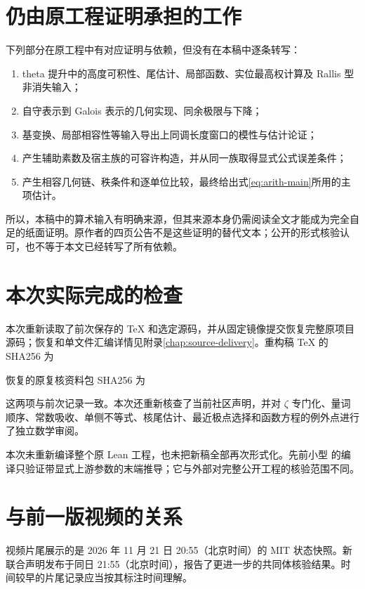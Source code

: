 \documentclass[UTF8,fontset=fandol,a4paper,openany,oneside]{ctexbook}
\theoremstyle{definition}
\theoremstyle{remark}
\begin{document}
\section{仍由原工程证明承担的工作}
下列部分在原工程中有对应证明与依赖，但没有在本稿中逐条转写：
\begin{enumerate}
\item theta 提升中的高度可积性、尾估计、局部函数、实位最高权计算及 Rallis 型非消失输入；
\item 自守表示到 Galois 表示的几何实现、同余极限与下降；
\item 基变换、局部相容性等输入导出上同调长度窗口的模性与估计论证；
\item 产生辅助素数及宿主族的可容许构造，并从同一族取得显式公式误差条件；
\item 产生相容几何链、秩条件和逐单位比较，最终给出式\eqref{eq:arith-main}所用的主项估计。
\end{enumerate}

所以，本稿中的算术输入有明确来源，但其来源本身仍需阅读全文才能成为完全自足的纸面证明。原作者的四页公告不是这些证明的替代文本；公开的形式核验认可，也不等于本文已经转写了所有依赖。

\section{本次实际完成的检查}
本次重新读取了前次保存的 TeX 和选定源码，并从固定镜像提交恢复完整原项目源码；恢复和单文件汇编详情见附录\ref{chap:source-delivery}。重构稿 TeX 的 SHA256 为
\begin{quote}\small
{}
\end{quote}
恢复的原复核资料包 SHA256 为
\begin{quote}\small
{}
\end{quote}
这两项与前次记录一致。本次还重新核查了当前社区声明，并对 $\zeta$ 专门化、量词顺序、常数吸收、单侧不等式、核尾估计、最近极点选择和函数方程的例外点进行了独立数学审阅。

本次未重新编译整个原 Lean 工程，也未把新稿全部再次形式化。先前小型  的编译只验证带显式上游参数的末端推导；它与外部对完整公开工程的核验范围不同。

\section{与前一版视频的关系}
视频片尾展示的是 2026 年 11 月 21 日 20:55（北京时间）的 MIT 状态快照。新联合声明发布于同日 21:55（北京时间），报告了更进一步的共同体核验结果。时间较早的片尾记录应当按其标注时间理解。
\end{document}
